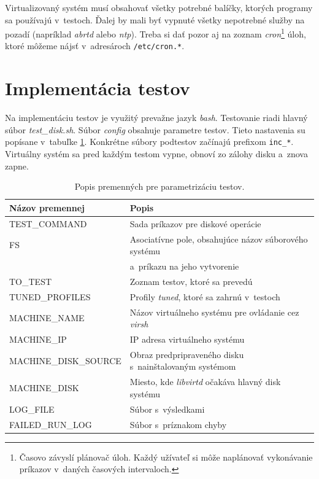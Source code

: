Virtualizovaný systém musí obsahovať všetky potrebné balíčky, ktorých programy
sa používajú v~testoch. Ďalej by mali byť vypnuté všetky nepotrebné služby na
pozadí (napríklad \emph{abrtd} alebo \emph{ntp}). Treba si dať pozor aj na
zoznam \emph{cron}\footnote{Časovo závyslí plánovač úloh. Každý užívateľ si
môže naplánovať vykonávanie príkazov v~daných časových intervaloch.} úloh,
ktoré môžeme nájsť v~adresároch \texttt{/etc/cron.*}.

%
%

\section{Implementácia testov}

Na implementáciu testov je využitý prevažne jazyk \emph{bash}. Testovanie riadi
hlavný súbor \emph{test\_disk.sh}. Súbor \emph{config} obsahuje parametre
testov.  Tieto nastavenia su popísane v~tabuľke \ref{tab:test-params}.
Konkrétne súbory podtestov začínajú prefixom \texttt{inc\_*}. Virtuálny systém
sa pred každým testom vypne, obnoví zo zálohy disku a~znova zapne.

\begin{table}[H]
\begin{center}
\begin{tabular}{|l|l|}
    \hline
    \textbf{Názov premennej} & \textbf{Popis} \\
    \hline
    TEST\_COMMAND           & Sada príkazov pre diskové operácie \\
    FS                      & Asociatívne pole, obsahujúce názov súborového systému \\
                            & a~príkazu na jeho vytvorenie \\
    TO\_TEST                & Zoznam testov, ktoré sa prevedú \\
    TUNED\_PROFILES         & Profily \emph{tuned}, ktoré sa zahrnú v~testoch \\
    MACHINE\_NAME           & Názov virtuálneho systému pre ovládanie cez \emph{virsh} \\
    MACHINE\_IP             & IP adresa virtuálneho systému \\
    MACHINE\_DISK\_SOURCE   & Obraz predpripraveného disku s~nainštalovaným systémom \\
    MACHINE\_DISK           & Miesto, kde \emph{libvirtd} očakáva hlavný disk systému \\
    LOG\_FILE               & Súbor s~výsledkami \\
    FAILED\_RUN\_LOG        & Súbor s~príznakom chyby \\
    \hline
\end{tabular}
\caption{Popis premenných pre parametrizáciu testov.}
\label{tab:test-params}
\end{center}
\end{table}

